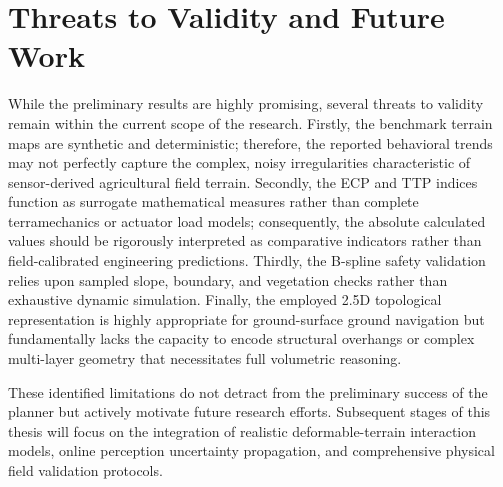 \section{Threats to Validity and Future Work}
While the preliminary results are highly promising, several threats to validity remain within the
current scope of the research. Firstly, the benchmark terrain maps are synthetic and deterministic;
therefore, the reported behavioral trends may not perfectly capture the complex, noisy
irregularities characteristic of sensor-derived agricultural field terrain. Secondly, the ECP and
TTP indices function as surrogate mathematical measures rather than complete terramechanics or
actuator load models; consequently, the absolute calculated values should be rigorously interpreted
as comparative indicators rather than field-calibrated engineering predictions. Thirdly, the
B-spline safety validation relies upon sampled slope, boundary, and vegetation checks rather than
exhaustive dynamic simulation. Finally, the employed 2.5D topological representation is highly
appropriate for ground-surface ground navigation but fundamentally lacks the capacity to encode
structural overhangs or complex multi-layer geometry that necessitates full volumetric reasoning.

These identified limitations do not detract from the preliminary success of the planner but actively
motivate future research efforts. Subsequent stages of this thesis will focus on the integration of
realistic deformable-terrain interaction models, online perception uncertainty propagation, and
comprehensive physical field validation protocols.
